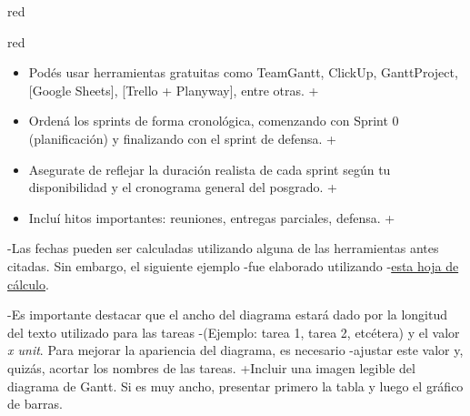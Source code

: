 \documentclass[
 11pt, %
-%
+codirector, %
 ]{charter}
\begin{document}
\begin{table}[ht]
\begin{table}[ht]
\begin{consigna}{red}
\begin{consigna}{red}
\begin{itemize}
-En la figura \ref{fig:gantt}, se muestra un ejemplo de diagrama de gantt realizado con el paquete de \textit{pgfgantt}. 
-En la plantilla pueden ver el código que lo genera y usarlo de base para construir el propio.
+	\item Podés usar herramientas gratuitas como TeamGantt, ClickUp, GanttProject, [Google Sheets], [Trello + Planyway], entre otras.
+	\item Ordená los sprints de forma cronológica, comenzando con Sprint 0 (planificación) y finalizando con el sprint de defensa.
+	\item Asegurate de reflejar la duración realista de cada sprint según tu disponibilidad y el cronograma general del posgrado.
+	\item Incluí hitos importantes: reuniones, entregas parciales, defensa.
+\end{itemize}
 
-Las fechas pueden ser calculadas utilizando alguna de las herramientas antes citadas. Sin embargo, el siguiente ejemplo
-fue elaborado utilizando 
-\href{https://docs.google.com/spreadsheets/d/1fBz8NhSpc4tkkhz3KjJCbh1nR_ltDkfEcZi4tZXduqs}{esta hoja de cálculo}.
 
-Es importante destacar que el ancho del diagrama estará dado por la longitud del texto utilizado para las tareas 
-(Ejemplo: tarea 1, tarea 2, etcétera) y el valor \textit{x unit}. Para mejorar la apariencia del diagrama, es necesario
-ajustar este valor y, quizás, acortar los nombres de las tareas.
+Incluir una imagen legible del diagrama de Gantt. Si es muy ancho, presentar primero la tabla y luego el gráfico de barras.
 

\end{consigna}
\end{consigna}
\end{table}
\end{table}
\end{document}
